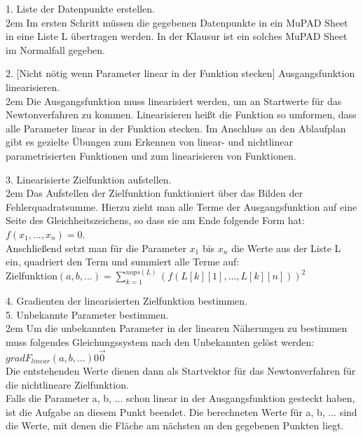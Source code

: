 \documentclass[11pt,final]{scrreprt}
\begin{document}
1. Liste der Datenpunkte erstellen.\\

\begingroup
\leftskip2em 
Im ersten Schritt müssen die gegebenen Datenpunkte in ein MuPAD Sheet in eine Liste L übertragen werden. In der Klausur ist ein solches MuPAD Sheet im Normalfall gegeben.\\
\par	
\endgroup

2. [Nicht nötig wenn Parameter linear in der Funktion stecken] Ausgangsfunktion linearisieren.\\

\begingroup
\leftskip2em 
Die Ausgangsfunktion muss linearisiert werden, um an Startwerte für das Newtonverfahren zu kommen. Linearisieren heißt die Funktion so umformen, dass alle Parameter linear in der Funktion stecken. Im Anschluss an den Ablaufplan gibt es gezielte Übungen zum Erkennen von linear- und nichtlinear parametrisierten Funktionen und zum linearisieren von Funktionen.\\
\par	
\endgroup

3. Linearisierte Zielfunktion aufstellen.\\

\begingroup
\leftskip2em 
Das Aufstellen der Zielfunktion funktioniert über das Bilden der Fehlerquadratsumme. Hierzu zieht man alle Terme der Ausgangsfunktion auf eine Seite des Gleichheitszeichens, so dass sie am Ende folgende Form hat:\\
$f(x_1, ...,x_n)=0$.\\
Anschließend setzt man für die Parameter $x_1$ bis $x_n$ die Werte aus der Liste L ein, quadriert den Term und summiert alle Terme auf:\\
Zielfunktion$(a, b, ...)=\sum\limits_{k=1}^{nops(L)} (f(L[k][1], ..., L[k][n]))^2 $\\
\par	
\endgroup

4. Gradienten der linearisierten Zielfunktion bestimmen.\\

5. Unbekannte Parameter bestimmen.\\

\begingroup
\leftskip2em 
Um die unbekannten Parameter in der linearen Näherungen zu bestimmen muss folgendes Gleichungssystem nach den Unbekannten gelöst werden:\\
$ gradF_{linear}(a, b, ...) 0 \overrightarrow{0} $\\
Die entstehenden Werte dienen dann als Startvektor für das Newtonverfahren für die nichtlineare Zielfunktion.\\
Falls die Parameter a, b, ... schon linear in der Ausgangsfunktion gesteckt haben, ist die Aufgabe an diesem Punkt beendet. Die berechneten Werte für a, b, ... sind die Werte, mit denen die Fläche am nächsten an den gegebenen Punkten liegt.\\
\par	
\endgroup
\end{document}

